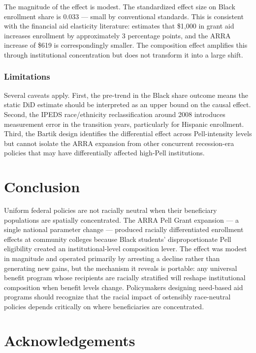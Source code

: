 \documentclass[12pt]{article}
\begin{document}
The magnitude of the effect is modest. The standardized effect size on Black enrollment share is 0.033 --- small by conventional standards. This is consistent with the financial aid elasticity literature: \citet{dynarski2003does} estimates that \$1,000 in grant aid increases enrollment by approximately 3 percentage points, and the ARRA increase of \$619 is correspondingly smaller. The composition effect amplifies this through institutional concentration but does not transform it into a large shift.

\subsubsection*{Limitations} Several caveats apply. First, the pre-trend in the Black share outcome means the static DiD estimate should be interpreted as an upper bound on the causal effect. Second, the IPEDS race/ethnicity reclassification around 2008 introduces measurement error in the transition years, particularly for Hispanic enrollment. Third, the Bartik design identifies the differential effect across Pell-intensity levels but cannot isolate the ARRA expansion from other concurrent recession-era policies that may have differentially affected high-Pell institutions.

\section{Conclusion}

Uniform federal policies are not racially neutral when their beneficiary populations are spatially concentrated. The ARRA Pell Grant expansion --- a single national parameter change --- produced racially differentiated enrollment effects at community colleges because Black students' disproportionate Pell eligibility created an institutional-level composition lever. The effect was modest in magnitude and operated primarily by arresting a decline rather than generating new gains, but the mechanism it reveals is portable: any universal benefit program whose recipients are racially stratified will reshape institutional composition when benefit levels change. Policymakers designing need-based aid programs should recognize that the racial impact of ostensibly race-neutral policies depends critically on where beneficiaries are concentrated.

\section*{Acknowledgements}
\end{document}
